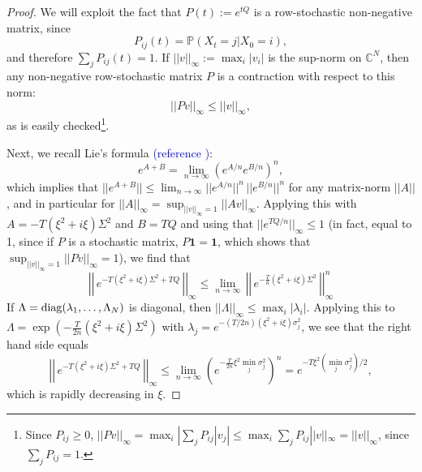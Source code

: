 \documentclass[a4paper, 11pt]{amsart}
\newtheorem{definition and theorem}[theorem]{Definition and   
Theorem}
\begin{document}
\begin{proof} We will exploit the fact that $P(t) := e^{t Q } $ is a row-stochastic non-negative matrix, since
    $$
        P_{ij } (t) = \mathbb{P } (X_t = j | X_0 = i ) ,
    $$
    and therefore $\sum _j P_{ij } (t ) = 1 . $
    If $|| v ||_{\infty } := \max _i |v_i | $ is the sup-norm on $\mathbb{C }^N $, then any non-negative row-stochastic matrix $P $ is a contraction with respect to this norm:
    $$
        || P v ||_{\infty } \leq || v ||_{\infty } ,
    $$
    as is easily checked\footnote{Since $P_{ij } \geq 0 $, $|| Pv ||_{\infty } = \max _i  | \sum _j P_{ij } |v_j | \leq \max _i \sum _j P_{ij } || v ||_{\infty } = || v ||_{\infty } $, since $\sum _j P_{ij } = 1 . $ }.

    Next, we recall Lie's formula \textcolor{blue}{(reference \cite{? })}:
    $$
        e^{A + B } = \lim _{n \to \infty } \left( e^{A/n } e^{B/n } \right)^n ,
    $$
    which implies that $|| e^{A + B } || \leq \lim _{n \to \infty } || e^{A/n } || ^n \, || e^{B / n } || ^n $ for any matrix-norm $|| A || $, and in particular for $|| A ||_{\infty } = \sup _{|| v ||_{\infty } = 1 } || A v ||_{\infty } . $ Applying this with $A = - T (\xi ^2 + i \xi ) \Sigma ^2 $ and $B = T Q $ and using that $|| e^{T Q / n } ||_{\infty } \leq 1 $ (in fact, equal to 1, since if $P $ is a stochastic matrix, $P \mathbf{1 } = \mathbf{1 } $, which shows that $\sup _{|| v ||_{\infty } = 1 } || P v ||_{\infty } = 1 $), we find that
    $$
        \left | \left | \, e^{- T(\xi ^2 + i \xi ) \Sigma ^2 + T Q } \, \right | \right | _{\infty } \leq \lim _{n \to \infty } \, \left | \left | \, e^{ - \frac{T }{n } (\xi ^2 + i \xi ) \Sigma ^2 } \, \right | \right | _{\infty } ^n
    $$
    If $\Lambda = {\rm diag} ( \lambda _1 , \ldots , \Lambda _N ) $ is diagonal, then $|| \Lambda ||_{\infty } \leq \max _i |\lambda _i | . $ Applying this to $\Lambda = \exp ( - \frac{T }{2n } (\xi ^2 + i \xi ) \Sigma ^2 ) $ with $\lambda _j = e^{- (T/2n ) (\xi ^2 + i \xi ) \sigma _j ^2 } $, we see that the right hand side equals
    $$
        \left | \left | \, e^{- T(\xi ^2 + i \xi ) \Sigma ^2 + T Q } \, \right | \right | _{\infty } \leq \lim _{n \to \infty } \left( e^{ - \frac{T }{2n } \xi ^2 \min _j \sigma _j ^2 } \right) ^n = e^{- T \xi ^2 (\min _j \sigma _j ^2 ) / 2 } ,
    $$
    which is rapidly decreasing in $\xi . $


\end{proof}
\end{document}
